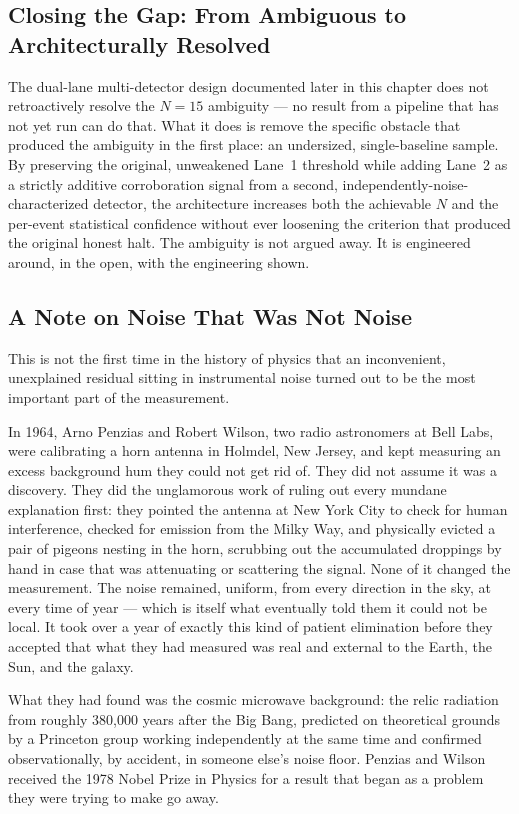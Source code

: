 \documentclass[11pt, letterpaper, openany]{book}
\begin{document}
\subsection*{Closing the Gap: From Ambiguous to Architecturally Resolved}
 
The dual-lane multi-detector design documented later in this chapter
does not retroactively resolve the $N=15$ ambiguity --- no result from a
pipeline that has not yet run can do that. What it does is remove the
specific obstacle that produced the ambiguity in the first place: an
undersized, single-baseline sample. By preserving the original, unweakened
Lane~1 threshold while adding Lane~2 as a strictly additive
corroboration signal from a second, independently-noise-characterized
detector, the architecture increases both the achievable $N$ and the
per-event statistical confidence without ever loosening the criterion
that produced the original honest halt. The ambiguity is not argued
away. It is engineered around, in the open, with the engineering shown.
 
\subsection*{A Note on Noise That Was Not Noise}
 
This is not the first time in the history of physics that an
inconvenient, unexplained residual sitting in instrumental noise turned
out to be the most important part of the measurement.
 
In 1964, Arno Penzias and Robert Wilson, two radio astronomers at Bell
Labs, were calibrating a horn antenna in Holmdel, New Jersey, and kept
measuring an excess background hum they could not get rid of. They did
not assume it was a discovery. They did the unglamorous work of ruling
out every mundane explanation first: they pointed the antenna at New
York City to check for human interference, checked for emission from the
Milky Way, and physically evicted a pair of pigeons nesting in the horn,
scrubbing out the accumulated droppings by hand in case that was
attenuating or scattering the signal. None of it changed the
measurement. The noise remained, uniform, from every direction in the
sky, at every time of year --- which is itself what eventually told them
it could not be local. It took over a year of exactly this kind of
patient elimination before they accepted that what they had measured was
real and external to the Earth, the Sun, and the galaxy.
 
What they had found was the cosmic microwave background: the relic
radiation from roughly 380,000 years after the Big Bang, predicted on
theoretical grounds by a Princeton group working independently at the
same time and confirmed observationally, by accident, in someone else's
noise floor. Penzias and Wilson received the 1978 Nobel Prize in Physics
for a result that began as a problem they were trying to make go away.
 
\end{document}
